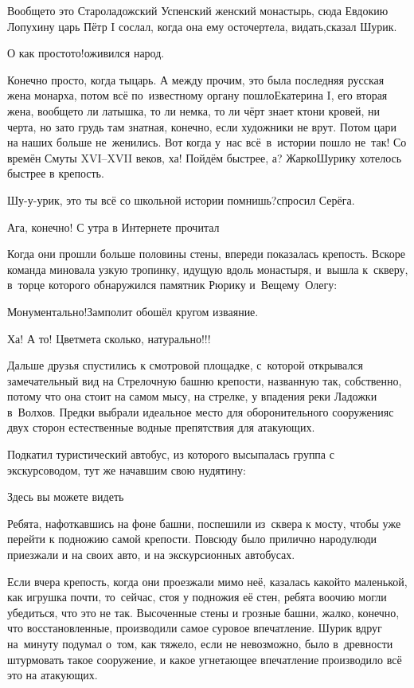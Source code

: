 \diagdash Вообще\sdash то это Староладожский Успенский женский монастырь, сюда Евдокию Лопухину царь Пётр I сослал, когда она ему осточертела, видать,\mdash сказал Шурик.

\diagdash О как просто\sdash то!\mdash оживился народ.

\diagdash Конечно просто, когда ты\mdash царь. А между прочим, это была последняя русская жена монарха, потом всё по~известному органу пошло\mdash Екатерина I, его вторая жена, вообще\mdash то ли латышка, то ли немка, то ли чёрт знает кто\mdash ни кровей, ни черта, но зато грудь там знатная, конечно, если художники не врут. Потом цари на наших больше не~женились. Вот когда у~нас всё~в~истории пошло не~так! Со времён Смуты  XVI\nobreakdash--XVII веков, ха! Пойдём быстрее, а? Жарко\myldots{}\mdash Шурику  хотелось быстрее в крепость.

\diagdash Шу-у-урик, это ты всё со школьной истории помнишь?\mdash спросил Серёга.

\diagdash Ага, конечно! С утра в Интернете прочитал\myldots{}

\vspace{1.0cm}
\myldots{}Когда они прошли больше половины стены, впереди показалась крепость. Вскоре команда миновала узкую тропинку, идущую вдоль монастыря, и~вышла к~скверу, в~торце которого обнаружился памятник Рюрику и~Вещему~Олегу:

\diagdash Монументально!\mdash Замполит обошёл кругом изваяние.

\diagdash Ха! А то! Цветмета сколько, натурально!!!

Дальше друзья спустились к смотровой площадке, с~которой открывался замечательный вид на Стрелочную башню крепости, названную так, собственно, потому что она стоит на самом мысу, на стрелке, у впадения реки Ладожки в~Волхов. Предки выбрали идеальное место для оборонительного сооружения\mdash с двух сторон естественные водные препятствия для атакующих.

Подкатил туристический автобус, из которого высыпалась группа с экскурсоводом, тут же начавшим свою нудятину:

\diagdash Здесь вы можете видеть\myldots{}

Ребята, нафоткавшись на фоне башни, поспешили из~сквера к мосту, чтобы уже перейти к подножию самой крепости. Повсюду было прилично народу\mdash люди приезжали и на своих авто, и на экскурсионных автобусах.

Если вчера крепость, когда они проезжали мимо неё, казалась какой\sdash то маленькой, как игрушка почти, то~сейчас, стоя у подножия её стен, ребята воочию могли убедиться, что это не так. Высоченные стены и грозные башни, жалко, конечно, что восстановленные, производили самое суровое впечатление. Шурик вдруг на~минуту подумал о~том, как тяжело, если не невозможно, было в~древности штурмовать такое сооружение, и какое угнетающее впечатление производило всё это на атакующих.

